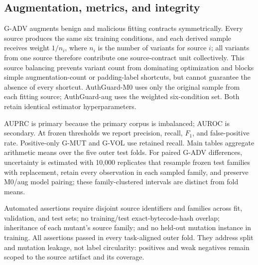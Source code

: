 \subsection{Augmentation, metrics, and integrity}

G-ADV augments benign and malicious fitting contracts symmetrically. Every source produces the same six training conditions, and each derived sample receives weight $1/n_i$, where $n_i$ is the number of variants for source $i$; all variants from one source therefore contribute one source-contract unit collectively. This source balancing prevents variant count from dominating optimization and blocks simple augmentation-count or padding-label shortcuts, but cannot guarantee the absence of every shortcut. AuthGuard-M0 uses only the original sample from each fitting source; AuthGuard-aug uses the weighted six-condition set. Both retain identical estimator hyperparameters.

AUPRC is primary because the primary corpus is imbalanced; AUROC is secondary. At frozen thresholds we report precision, recall, $F_1$, and false-positive rate. Positive-only G-MUT and G-VOL use retained recall. Main tables aggregate arithmetic means over the five outer test folds. For paired G-ADV differences, uncertainty is estimated with 10,000 replicates that resample frozen test families with replacement, retain every observation in each sampled family, and preserve M0/aug model pairing; these family-clustered intervals are distinct from fold means.

Automated assertions require disjoint source identifiers and families across fit, validation, and test sets; no training/test exact-bytecode-hash overlap; inheritance of each mutant's source family; and no held-out mutation instance in training. All assertions passed in every task-aligned outer fold. They address split and mutation leakage, not label circularity: positives and weak negatives remain scoped to the source artifact and its coverage.

